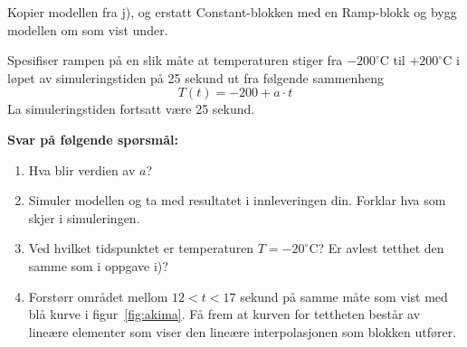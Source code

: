 

\item[k)]
  Kopier modellen fra j), og erstatt {\sf  Constant}-blokken
  med en {\sf  Ramp}-blokk og bygg modellen om som vist under.

  \begin{figure}[H]
    \centering
    \hspace*{0mm}
  \end{figure}

  Spesifiser rampen på en slik måte at
  temperaturen stiger fra $-200^{\circ}$C til $+200^{\circ}$C i løpet av
  simuleringstiden på 25 sekund ut fra følgende sammenheng
    \begin{equation}
    \label{eq:F_tb}
    T(t) = -200 + a{\cdot}t 
  \end{equation}
  {\color{red}La simuleringstiden fortsatt være 25 sekund.  }

      {\bf Svar på følgende spørsmål:    }

\begin{enumerate}[label=k\arabic*)]
        \item Hva blir verdien av $a$?
  \item   Simuler modellen og ta med resultatet i
    innleveringen din.    Forklar hva som skjer i simuleringen.

\item Ved hvilket tidspunktet er temperaturen $T{=}-20^{\circ}$C? Er
  avlest tetthet den samme som i oppgave i)?  
    
\item   Forstørr området mellom $12{<}t{<}17$ sekund på samme måte som
   vist med blå kurve i figur~\ref{fig:akima}.  Få frem at 
  kurven for tettheten består av lineære elementer som viser den lineære
  interpolasjonen som blokken utfører.

  \end{enumerate}
  
